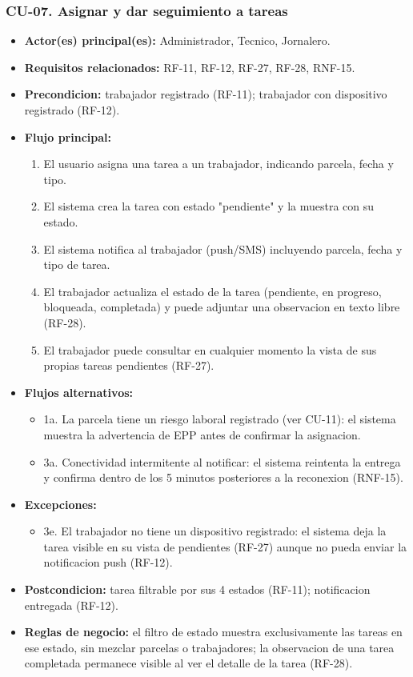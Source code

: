 \documentclass[11pt,a4paper]{article}
\begin{document}
\subsubsection{CU-07. Asignar y dar seguimiento a tareas}
\begin{itemize}
\item \textbf{Actor(es) principal(es):} Administrador, Tecnico, Jornalero.
\item \textbf{Requisitos relacionados:} RF-11, RF-12, RF-27, RF-28, RNF-15.
\item \textbf{Precondicion:} trabajador registrado (RF-11); trabajador con dispositivo registrado (RF-12).
\item \textbf{Flujo principal:}
  \begin{enumerate}
  \item El usuario asigna una tarea a un trabajador, indicando parcela, fecha y tipo.
  \item El sistema crea la tarea con estado "pendiente" y la muestra con su estado.
  \item El sistema notifica al trabajador (push/SMS) incluyendo parcela, fecha y tipo de tarea.
  \item El trabajador actualiza el estado de la tarea (pendiente, en progreso, bloqueada, completada) y puede adjuntar una observacion en texto libre (RF-28).
  \item El trabajador puede consultar en cualquier momento la vista de sus propias tareas pendientes (RF-27).
  \end{enumerate}
\item \textbf{Flujos alternativos:}
  \begin{itemize}
  \item 1a. La parcela tiene un riesgo laboral registrado (ver CU-11): el sistema muestra la advertencia de EPP antes de confirmar la asignacion.
  \item 3a. Conectividad intermitente al notificar: el sistema reintenta la entrega y confirma dentro de los 5 minutos posteriores a la reconexion (RNF-15).
  \end{itemize}
\item \textbf{Excepciones:}
  \begin{itemize}
  \item 3e. El trabajador no tiene un dispositivo registrado: el sistema deja la tarea visible en su vista de pendientes (RF-27) aunque no pueda enviar la notificacion push (RF-12).
  \end{itemize}
\item \textbf{Postcondicion:} tarea filtrable por sus 4 estados (RF-11); notificacion entregada (RF-12).
\item \textbf{Reglas de negocio:} el filtro de estado muestra exclusivamente las tareas en ese estado, sin mezclar parcelas o trabajadores; la observacion de una tarea completada permanece visible al ver el detalle de la tarea (RF-28).
\end{itemize}
\end{document}

